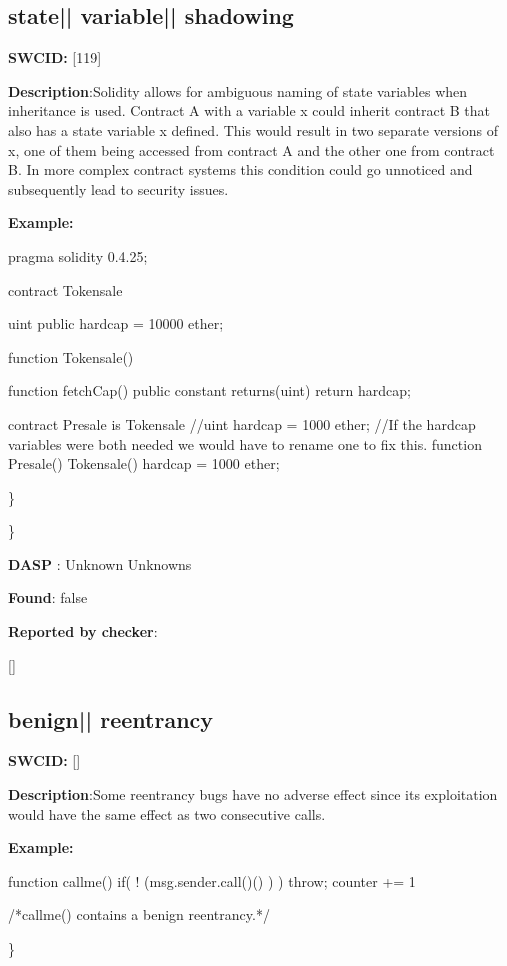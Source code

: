 \documentclass{article}
\begin{document}
\subsection{state{|\textunderscore| }variable{|\textunderscore| }shadowing} 
\textbf{SWC{\textunderscore }ID:} [119]

\textbf{Description}:Solidity allows for ambiguous naming of state variables when inheritance is used. Contract A with a variable x could inherit contract B that also has a state variable x defined. This would result in two separate versions of x, one of them being accessed from contract A and the other one from contract B. In more complex contract systems this condition could go unnoticed and subsequently lead to security issues.


\textbf{Example:} 
\begin{ffcode} 

pragma solidity 0.4.25;

contract Tokensale {
    uint public hardcap = 10000 ether;

    function Tokensale() {}

    function fetchCap() public constant returns(uint) {
        return hardcap;
    }
}

contract Presale is Tokensale {
    //uint hardcap = 1000 ether;
    //If the hardcap variables were both needed we would have to rename one to fix this.
    function Presale() Tokensale() {
        hardcap = 1000 ether;
    }
}

\end{ffcode} 
\} 

\} 

\textbf{DASP} : Unknown Unknowns

\textbf{Found}: false

\textbf{Reported by checker}: 
\begin{ffcode} 

[]
\end{ffcode} 
\subsection{benign{|\textunderscore| }reentrancy} 
\textbf{SWC{\textunderscore }ID:} []

\textbf{Description}:Some re{\textendash}entrancy bugs have no adverse effect since its exploitation would have the same effect as two consecutive calls.


\textbf{Example:} 
\begin{ffcode} 

function callme(){
  if( ! (msg.sender.call()() ) ){
    throw;
  }
  counter += 1
}

 /*callme() contains a benign reentrancy.*/ 

\end{ffcode} 
\} 
\end{document}
